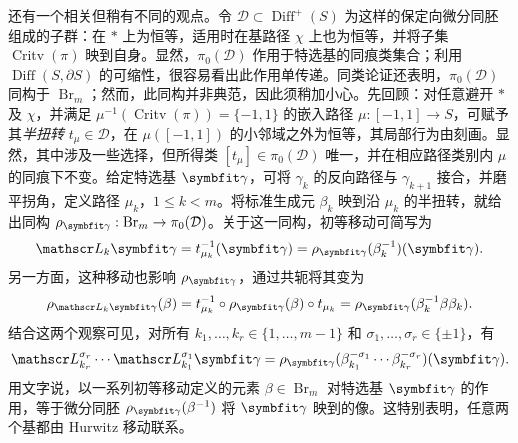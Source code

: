 还有一个相关但稍有不同的观点。令 $\mathcal D\subset\operatorname{Diff}^+(S)$ 为这样的保定向微分同胚组成的子群：在 $*$ 上为恒等，适用时在基路径 $\chi$ 上也为恒等，并将子集 $\operatorname{Critv}(\pi)$ 映到自身。显然，$\pi_0(\mathcal D)$ 作用于特选基的同痕类集合；利用 $\operatorname{Diff}(S,\partial S)$ 的可缩性，很容易看出此作用单传递。同类论证还表明，$\pi_0(\mathcal D)$ 同构于 $\operatorname{Br}_m$；然而，此同构并非典范，因此须稍加小心。先回顾：对任意避开 $*$ 及 $\chi$，并满足 $\mu^{-1}(\operatorname{Critv}(\pi))=\{-1,1\}$ 的嵌入路径 $\mu:[-1,1]\to S$，可赋予其\emph{半扭转} $t_\mu\in\mathcal D$，在 $\mu([-1,1])$ 的小邻域之外为恒等，其局部行为由刻画。显然，其中涉及一些选择，但所得类 $[t_\mu]\in\pi_0(\mathcal D)$ 唯一，并在相应路径类别内 $\mu$ 的同痕下不变。给定特选基 $\symbfit\gamma$，可将 $\gamma_k$ 的反向路径与 $\gamma_{k+1}$ 接合，并磨平拐角，定义路径 $\mu_k$，$1\leq k<m$。将标准生成元 $\beta_k$ 映到沿 $\mu_k$ 的半扭转，就给出同构 $\rho_{\symbfit\gamma}:\operatorname{Br}_m\to\pi_0(\mathcal D)$。关于这一同构，初等移动可简写为
\[
\mathscr L_k\symbfit\gamma=t_{\mu_k}^{-1}(\symbfit\gamma)
=\rho_{\symbfit\gamma}(\beta_k^{-1})(\symbfit\gamma).
\]
另一方面，这种移动也影响 $\rho_{\symbfit\gamma}$，通过共轭将其变为
\[
\rho_{\mathscr L_k\symbfit\gamma}(\beta)
=t_{\mu_k}^{-1}\circ\rho_{\symbfit\gamma}(\beta)\circ t_{\mu_k}
=\rho_{\symbfit\gamma}(\beta_k^{-1}\beta\beta_k).
\]
结合这两个观察可见，对所有 $k_1,\ldots,k_r\in\{1,\ldots,m-1\}$ 和 $\sigma_1,\ldots,\sigma_r\in\{\pm1\}$，有
\[
\mathscr L_{k_r}^{\sigma_r}\cdots\mathscr L_{k_1}^{\sigma_1}\symbfit\gamma
=\rho_{\symbfit\gamma}(\beta_{k_1}^{-\sigma_1}\cdots\beta_{k_r}^{-\sigma_r})(\symbfit\gamma).
\]
用文字说，以一系列初等移动定义的元素 $\beta\in\operatorname{Br}_m$ 对特选基 $\symbfit\gamma$ 的作用，等于微分同胚 $\rho_{\symbfit\gamma}(\beta^{-1})$ 将 $\symbfit\gamma$ 映到的像。这特别表明，任意两个基都由 Hurwitz 移动联系。

